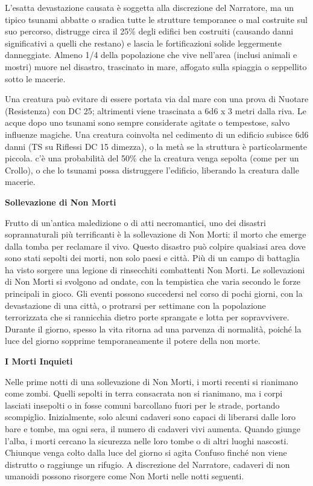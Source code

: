 \documentclass[a4paper,11pt,twoside,openany]{book}
\begin{document}
L'esatta devastazione causata è soggetta alla discrezione del Narratore, ma un tipico tsunami abbatte o sradica tutte le strutture temporanee o mal costruite sul suo percorso, distrugge circa il 25\% degli edifici ben costruiti (causando danni significativi a quelli che restano) e lascia le fortificazioni solide leggermente danneggiate. Almeno 1/4 della popolazione che vive nell'area (inclusi animali e mostri) muore nel disastro, trascinato in mare, affogato sulla spiaggia o seppellito sotto le macerie.

Una creatura può evitare di essere portata via dal mare con una prova di Nuotare (Resistenza) con DC 25; altrimenti viene trascinata a 6d6 x 3 metri dalla riva. Le acque dopo uno tsunami sono sempre considerate agitate o tempestose, salvo influenze magiche. Una creatura coinvolta nel cedimento di un edificio subisce 6d6 danni (TS su Riflessi DC 15 dimezza), o la metà se la struttura è particolarmente piccola. c'è una probabilità del 50\% che la creatura venga sepolta (come per un Crollo), o che lo tsunami possa distruggere l'edificio, liberando la creatura dalle macerie.

\textbf{Sollevazione di Non Morti}

Frutto di un'antica maledizione o di atti necromantici, uno dei disastri soprannaturali più terrificanti è la sollevazione di Non Morti: il morto che emerge dal­la tomba per reclamare il vivo. Questo disastro può colpire qualsiasi area dove sono stati sepolti dei morti, non solo paesi e città. Più di un campo di battaglia ha visto sorgere una legione di rinsecchiti combattenti Non Morti. Le sollevazioni di Non Morti si svolgono ad ondate, con la tempistica che varia secondo le forze principali in gioco. Gli eventi possono succedersi nel corso di pochi giorni, con la devastazione di una città, o protrarsi per settimane con la popolazione terrorizzata che si rannicchia dietro porte sprangate e lotta per sopravvivere. Durante il giorno, spesso la vita ritorna ad una parvenza di normalità, poiché la luce del giorno sopprime temporaneamente il potere della non morte.

\textbf{I Morti Inquieti}

Nelle prime notti di una sollevazione di Non Morti, i morti recenti si rianimano come zombi. Quelli sepolti in terra consacrata non si rianimano, ma i corpi lasciati insepolti o in fosse comuni barcollano fuori per le strade, portando scompiglio. Inizialmente, solo alcuni cadaveri sono capaci di liberarsi dal­le loro bare e tombe, ma ogni sera, il numero di cadaveri vivi aumenta. Quando giunge l'alba, i morti cercano la sicurezza nelle loro tombe o di altri luoghi nascosti. Chiunque venga colto dalla luce del giorno si agita Confuso finché non viene distrutto o raggiunge un rifugio. A discrezione del Narratore, cadaveri di non umanoidi possono risorgere come Non Morti nelle notti seguenti.
\end{document}
